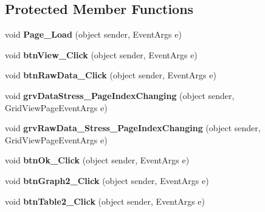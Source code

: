 \subsection*{Protected Member Functions}
\begin{DoxyCompactItemize}
\item 
\hypertarget{classusertrackmyhealth__stress_aa0f46555d31fe0137cb62d1fe5d6a906}{void {\bfseries Page\-\_\-\-Load} (object sender, Event\-Args e)}\label{classusertrackmyhealth__stress_aa0f46555d31fe0137cb62d1fe5d6a906}

\item 
\hypertarget{classusertrackmyhealth__stress_ab9abdc518d74f50d09efd9920c4d1127}{void {\bfseries btn\-View\-\_\-\-Click} (object sender, Event\-Args e)}\label{classusertrackmyhealth__stress_ab9abdc518d74f50d09efd9920c4d1127}

\item 
\hypertarget{classusertrackmyhealth__stress_a2c1e25d7a430a9fdfe2e94f215403f34}{void {\bfseries btn\-Raw\-Data\-\_\-\-Click} (object sender, Event\-Args e)}\label{classusertrackmyhealth__stress_a2c1e25d7a430a9fdfe2e94f215403f34}

\item 
\hypertarget{classusertrackmyhealth__stress_a50764cc073b6b3f8936516656695803f}{void {\bfseries grv\-Data\-Stress\-\_\-\-Page\-Index\-Changing} (object sender, Grid\-View\-Page\-Event\-Args e)}\label{classusertrackmyhealth__stress_a50764cc073b6b3f8936516656695803f}

\item 
\hypertarget{classusertrackmyhealth__stress_a6b59d81bcf9b77a4210802c9697b33c4}{void {\bfseries grv\-Raw\-Data\-\_\-\-Stress\-\_\-\-Page\-Index\-Changing} (object sender, Grid\-View\-Page\-Event\-Args e)}\label{classusertrackmyhealth__stress_a6b59d81bcf9b77a4210802c9697b33c4}

\item 
\hypertarget{classusertrackmyhealth__stress_a8b3cb470b7fa83fca27c59266bc05333}{void {\bfseries btn\-Ok\-\_\-\-Click} (object sender, Event\-Args e)}\label{classusertrackmyhealth__stress_a8b3cb470b7fa83fca27c59266bc05333}

\item 
\hypertarget{classusertrackmyhealth__stress_a17aaa23994d6ccb1efccdb3ac390e7f3}{void {\bfseries btn\-Graph2\-\_\-\-Click} (object sender, Event\-Args e)}\label{classusertrackmyhealth__stress_a17aaa23994d6ccb1efccdb3ac390e7f3}

\item 
\hypertarget{classusertrackmyhealth__stress_a078fb52ca85dc6ca5d98ecd4707ea4df}{void {\bfseries btn\-Table2\-\_\-\-Click} (object sender, Event\-Args e)}\label{classusertrackmyhealth__stress_a078fb52ca85dc6ca5d98ecd4707ea4df}


\end{DoxyCompactItemize}
